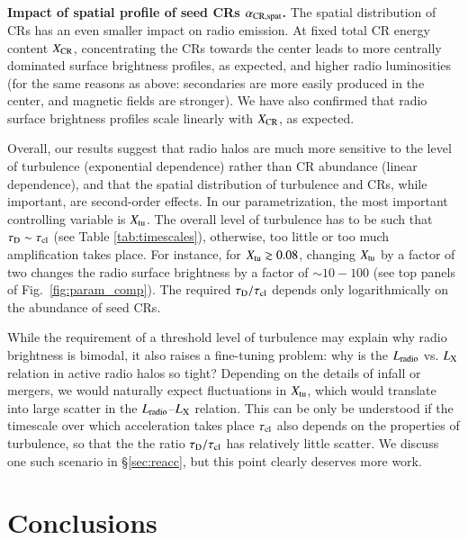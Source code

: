 \documentclass[fleqn,usenatbib,useAMS]{mnras}
\begin{document}
{\bf Impact of spatial profile of seed CRs $\alpha_{\rm CR, spat}$.} The spatial distribution of CRs has an even smaller impact on radio emission. At fixed total CR energy content $X_{\rm CR}$, concentrating the CRs towards the center leads to more centrally dominated surface brightness profiles, as expected, and higher radio luminosities (for the same reasons as above: secondaries are more easily produced in the center, and magnetic fields are stronger). We have also confirmed that radio surface brightness profiles scale linearly with $X_{\rm CR}$, as expected. 

Overall, our results suggest that radio halos are much more sensitive to the level of turbulence (exponential dependence) rather than CR abundance (linear dependence), and that the spatial distribution of turbulence and CRs, while important, are second-order effects. In our parametrization, the most important controlling variable is $X_{\rm tu}$. The overall level of turbulence has to be such that $\tau_{\rm D} \sim \tau_{\rm cl}$ (see Table \ref{tab:timescales}), otherwise, too little or too much amplification takes place. For instance, for $X_{\mathrm{tu}}\gtrsim0.08$, changing $X_{\mathrm{tu}}$ by a factor of two changes the radio surface brightness by a factor of $\sim 10-100$ (see top panels of Fig.~\ref{fig:param_comp}). The required $\tau_{\rm D}/\tau_{\rm cl}$ depends only logarithmically on the abundance of seed CRs.

While the requirement of a threshold level of turbulence may explain why radio brightness is bimodal, it also raises a fine-tuning problem: why is the $L_{\rm radio}$ vs. $L_{\rm X}$ relation in active radio halos so tight? Depending on the details of infall or mergers, we would naturally expect fluctuations in $X_{\rm tu}$, which would translate into large scatter in the $L_{\rm radio}$--$L_{\rm X}$ relation. This can be only be understood if the timescale over which acceleration takes place $\tau_{\rm cl}$ also depends on the properties of turbulence, so that the the ratio $\tau_{\rm D}/\tau_{\rm cl}$ has relatively little scatter. We discuss one such scenario in \S\ref{sec:reacc}, but this point clearly deserves more work.  


\section{Conclusions}
\label{sec:conclusions}
\end{document}
